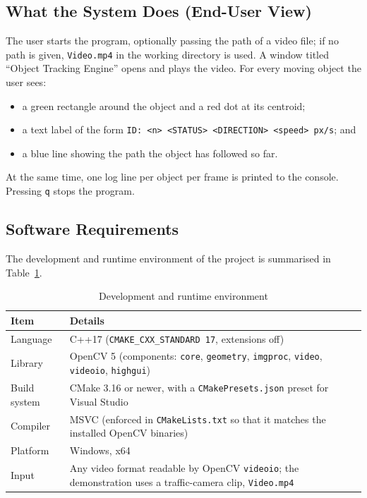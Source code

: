 \documentclass[12pt,a4paper,oneside]{book}
\begin{document}
\subsection{What the System Does (End-User View)}
The user starts the program, optionally passing the path of a video file; if no path is given, \texttt{Video.mp4} in the working directory is used. A window titled ``Object Tracking Engine'' opens and plays the video. For every moving object the user sees:
\begin{itemize}
    \item a green rectangle around the object and a red dot at its centroid;
    \item a text label of the form \texttt{ID: <n> <STATUS> <DIRECTION> <speed> px/s}; and
    \item a blue line showing the path the object has followed so far.
\end{itemize}
At the same time, one log line per object per frame is printed to the console. Pressing \texttt{q} stops the program.

\subsection{Software Requirements}
The development and runtime environment of the project is summarised in Table~\ref{tab:env}.

\begin{table}[H]
\centering
\caption{Development and runtime environment}
\label{tab:env}
\small
\begin{tabular}{@{}p{3.6cm}p{11cm}@{}}
\toprule
\textbf{Item} & \textbf{Details}\\
\midrule
Language & C++17 (\texttt{CMAKE\_CXX\_STANDARD 17}, extensions off)\\
Library & OpenCV 5 (components: \texttt{core}, \texttt{geometry}, \texttt{imgproc}, \texttt{video}, \texttt{videoio}, \texttt{highgui})\\
Build system & CMake 3.16 or newer, with a \texttt{CMakePresets.json} preset for Visual Studio\\
Compiler & MSVC (enforced in \texttt{CMakeLists.txt} so that it matches the installed OpenCV binaries)\\
Platform & Windows, x64\\
Input & Any video format readable by OpenCV \texttt{videoio}; the demonstration uses a traffic-camera clip, \texttt{Video.mp4}\\
\bottomrule
\end{tabular}
\end{table}
\end{document}
